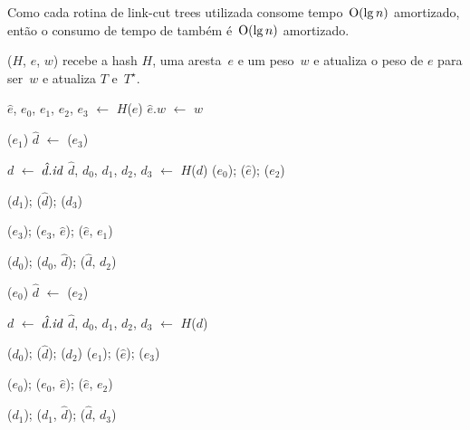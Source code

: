 Como cada rotina de link-cut trees utilizada consome tempo~$\mathrm{O}(\lg n)$ amortizado, então o consumo de tempo de \MSFupdate{} também é~$\mathrm{O}(\lg n)$ amortizado.



\MSFupdate($H$, $e$, $w$) recebe a hash $H$, uma aresta~$e$ e um peso~$w$ e atualiza o peso de $e$ para ser~$w$ e atualiza $T$ e~$T^\star$.

\begin{algorithm}[htb]
\caption{\MSFupdate($H$, $e$, $w$)}
\label{Algo:MSFupdate}
\begin{algorithmic}[1]
\State $\hat e$, $e_0$, $e_1$, $e_2$, $e_3$ $\gets$ $H$($e$)
\State $\hat e.w$ $\gets$ $w$
\label{Algo:MSFupdate:linhauvinF}

\State \linkcutEvert($e_1$)
\State $\hat d$ $\gets$ \linkcutMin($e_3$)

\State \Return
\EndIf
\State $d$ $\gets$ $\hat d.\textit{id}$
\State $\hat d$, $d_0$, $d_1$, $d_2$, $d_3$ $\gets$ $H$($d$)
\State \linkcutEvert($e_0$); \linkcutDelEdge($\hat e$); \linkcutDelEdge($e_2$)

\State \linkcutEvert($d_1$); \linkcutDelEdge($\hat d$); \linkcutDelEdge($d_3$)

\State \linkcutEvert($e_3$); \linkcutAddEdge($e_3$, $\hat e$); \linkcutAddEdge($\hat e$, $e_1$)

\State \linkcutEvert($d_0$); \linkcutAddEdge($d_0$, $\hat d$); \linkcutAddEdge($\hat d$, $d_2$)
\EndIf

\Else

\State \linkcutEvert($e_0$)
\State $\hat d$ $\gets$ \linkcutMax($e_2$)

\State \Return
\EndIf
\State $d$ $\gets$ $\hat d.\textit{id}$
\State $\hat d$, $d_0$, $d_1$, $d_2$, $d_3$ $\gets$ $H$($d$)

\State \linkcutEvert($d_0$); \linkcutDelEdge($\hat d$); \linkcutDelEdge($d_2$)
\State \linkcutEvert($e_1$); \linkcutDelEdge($\hat e$); \linkcutDelEdge($e_3$)

\State \linkcutEvert($e_0$); \linkcutAddEdge($e_0$, $\hat e$); \linkcutAddEdge($\hat e$, $e_2$)

\State \linkcutEvert($d_1$); \linkcutAddEdge($d_1$, $\hat d$); \linkcutAddEdge($\hat d$, $d_3$)

\EndIf
\EndIf
\end{algorithmic}
\end{algorithm}

